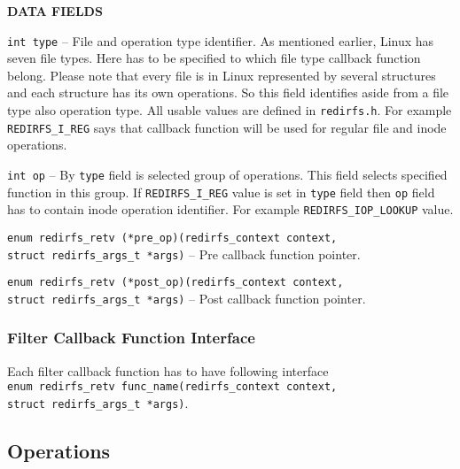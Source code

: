 \begin{list}{}{}
	\item \textbf{DATA FIELDS}
		\begin{list}{}{}
			\item \texttt{int type} -- File and operation type identifier. As
				mentioned earlier, Linux has seven file types. Here
				has to be specified to which file type callback
				function belong. Please note that every file is in
				Linux represented by several structures and each
				structure has its own operations. So this field
				identifies aside from a file type also operation type.
				All usable values are defined in \texttt{redirfs.h}.
				For example \texttt{REDIRFS\_I\_REG} says that
				callback function will be used for regular file and inode
				operations.
			\item \texttt{int op} -- By \texttt{type} field is selected
				group of operations. This field selects specified
				function in this group. If \texttt{REDIRFS\_I\_REG} value is
				set in \texttt{type} field then \texttt{op} field has to
				contain inode operation identifier. For example
				\texttt{REDIRFS\_IOP\_LOOKUP} value.
			\item \texttt{enum redirfs\_retv (*pre\_op)(redirfs\_context
				context,\\struct redirfs\_args\_t *args)} -- Pre
				callback function pointer.
			\item \texttt{enum redirfs\_retv (*post\_op)(redirfs\_context
				context,\\struct redirfs\_args\_t *args)} -- Post
				callback function pointer.
		\end{list}
\end{list}

\subsubsection{Filter Callback Function Interface}
Each filter callback function has to have following interface \\
\texttt{enum redirfs\_retv func\_name(redirfs\_context context,\\struct redirfs\_args\_t *args)}.

\subsection{Operations}

